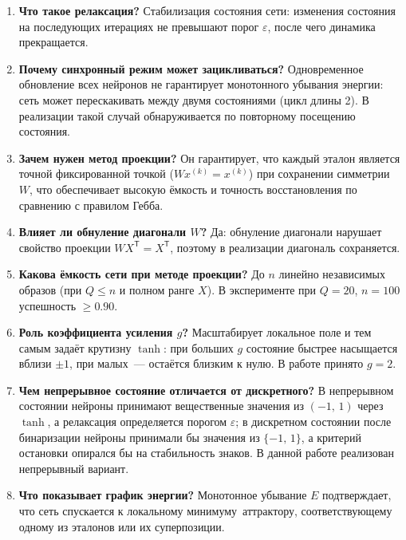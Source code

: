 \begin{enumerate}
	\item \textbf{Что такое релаксация?} Стабилизация состояния сети: изменения состояния на последующих итерациях не превышают порог $\varepsilon$, после чего динамика прекращается.
	\item \textbf{Почему синхронный режим может зацикливаться?} Одновременное обновление всех нейронов не гарантирует монотонного убывания энергии: сеть может перескакивать между двумя состояниями (цикл длины 2). В реализации такой случай обнаруживается по повторному посещению состояния.
	\item \textbf{Зачем нужен метод проекции?} Он гарантирует, что каждый эталон является точной фиксированной точкой ($W x^{(k)} = x^{(k)}$) при сохранении симметрии $W$, что обеспечивает высокую ёмкость и точность восстановления по сравнению с правилом Гебба.
	\item \textbf{Влияет ли обнуление диагонали $W$?} Да: обнуление диагонали нарушает свойство проекции $W X^{\mathsf{T}} = X^{\mathsf{T}}$, поэтому в реализации диагональ сохраняется.
	\item \textbf{Какова ёмкость сети при методе проекции?} До $n$ линейно независимых образов (при $Q \le n$ и полном ранге $X$). В эксперименте при $Q = 20$, $n = 100$ успешность $\ge 0.90$.
	\item \textbf{Роль коэффициента усиления $g$?} Масштабирует локальное поле и тем самым задаёт крутизну $\tanh$: при больших $g$ состояние быстрее насыщается вблизи $\pm 1$, при малых~--- остаётся близким к нулю. В работе принято $g = 2$.
	\item \textbf{Чем непрерывное состояние отличается от дискретного?} В непрерывном состоянии нейроны принимают вещественные значения из $(-1,\,1)$ через $\tanh$, а релаксация определяется порогом $\varepsilon$; в дискретном состоянии после бинаризации нейроны принимали бы значения из $\{-1,\,1\}$, а критерий остановки опирался бы на стабильность знаков. В данной работе реализован непрерывный вариант.
	\item \textbf{Что показывает график энергии?} Монотонное убывание $E$ подтверждает, что сеть спускается к локальному минимуму~\mdash  аттрактору, соответствующему одному из эталонов или их суперпозиции.
\end{enumerate}
